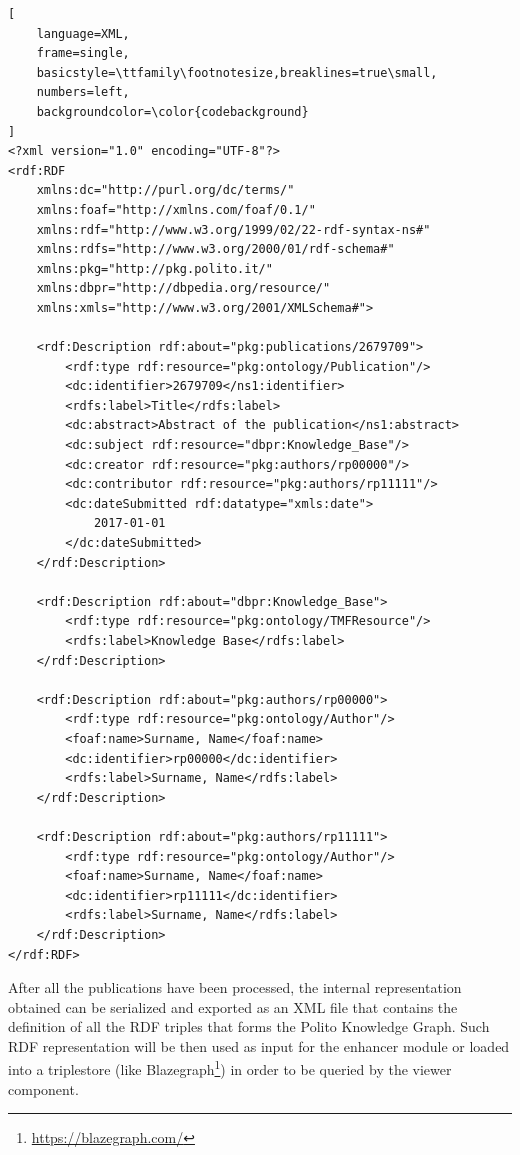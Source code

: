 \documentclass[%
    corpo=13.5pt,
    twoside,
    oldstyle,
    tipotesi=magistrale,
    greek,
    evenboxes
]{toptesi}
\begin{document}
\begin{lstlisting}[
    language=XML,
    frame=single,
    basicstyle=\ttfamily\footnotesize,breaklines=true\small,
    numbers=left,
    backgroundcolor=\color{codebackground}
]
<?xml version="1.0" encoding="UTF-8"?>
<rdf:RDF
    xmlns:dc="http://purl.org/dc/terms/"
    xmlns:foaf="http://xmlns.com/foaf/0.1/"
    xmlns:rdf="http://www.w3.org/1999/02/22-rdf-syntax-ns#"
    xmlns:rdfs="http://www.w3.org/2000/01/rdf-schema#"
    xmlns:pkg="http://pkg.polito.it/"
    xmlns:dbpr="http://dbpedia.org/resource/"
    xmlns:xmls="http://www.w3.org/2001/XMLSchema#">

    <rdf:Description rdf:about="pkg:publications/2679709">
        <rdf:type rdf:resource="pkg:ontology/Publication"/>
        <dc:identifier>2679709</ns1:identifier>
        <rdfs:label>Title</rdfs:label>
        <dc:abstract>Abstract of the publication</ns1:abstract>
        <dc:subject rdf:resource="dbpr:Knowledge_Base"/>
        <dc:creator rdf:resource="pkg:authors/rp00000"/>
        <dc:contributor rdf:resource="pkg:authors/rp11111"/>
        <dc:dateSubmitted rdf:datatype="xmls:date">
            2017-01-01
        </dc:dateSubmitted>
    </rdf:Description>

    <rdf:Description rdf:about="dbpr:Knowledge_Base">
        <rdf:type rdf:resource="pkg:ontology/TMFResource"/>
        <rdfs:label>Knowledge Base</rdfs:label>
    </rdf:Description>

    <rdf:Description rdf:about="pkg:authors/rp00000">
        <rdf:type rdf:resource="pkg:ontology/Author"/>
        <foaf:name>Surname, Name</foaf:name>
        <dc:identifier>rp00000</dc:identifier>
        <rdfs:label>Surname, Name</rdfs:label>
    </rdf:Description>

    <rdf:Description rdf:about="pkg:authors/rp11111">
        <rdf:type rdf:resource="pkg:ontology/Author"/>
        <foaf:name>Surname, Name</foaf:name>
        <dc:identifier>rp11111</dc:identifier>
        <rdfs:label>Surname, Name</rdfs:label>
    </rdf:Description>
</rdf:RDF>
\end{lstlisting}

\newpage

After all the publications have been processed, the internal representation
obtained can be serialized and exported as an XML file that contains the
definition of all the RDF triples that forms the Polito Knowledge Graph.
Such RDF representation will be then used as input for the enhancer module or
loaded into a triplestore (like
Blazegraph\footnote{\url{https://blazegraph.com/}}) in order to be queried by
the viewer component.
\end{document}
